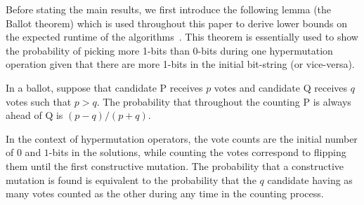 \documentclass[lettersize,journal]{IEEEtran}
\begin{document}
Before stating the main results, we first introduce the following lemma (the Ballot theorem) which is used throughout this paper to derive lower bounds on the expected runtime of the algorithms~\cite{feller1968,JansenZarges2011,CorusOlivetoYazdani2019TCS}.  This theorem is essentially used to show the probability of picking more 1-bits than 0-bits during one hypermutation operation given that there are more 1-bits in the initial bit-string (or vice-versa). 
%
\begin{lemma}  \label{lem:ballot} 
In a ballot, suppose that candidate P receives $p$ votes and candidate Q receives $q$ votes such that $p>q$. The probability that throughout the counting P is always ahead of Q is $(p-q)/(p+q)$. 
\end{lemma}

{\color{blue}In the context of hypermutation operators, the vote counts are the initial number of $0$ and $1$-bits in the solutions, while counting the votes correspond to flipping them until the first constructive mutation. The probability that a constructive mutation is found is equivalent to the probability that the $q$ candidate having as many votes counted as the other during any time in the counting process.}
\end{document}
